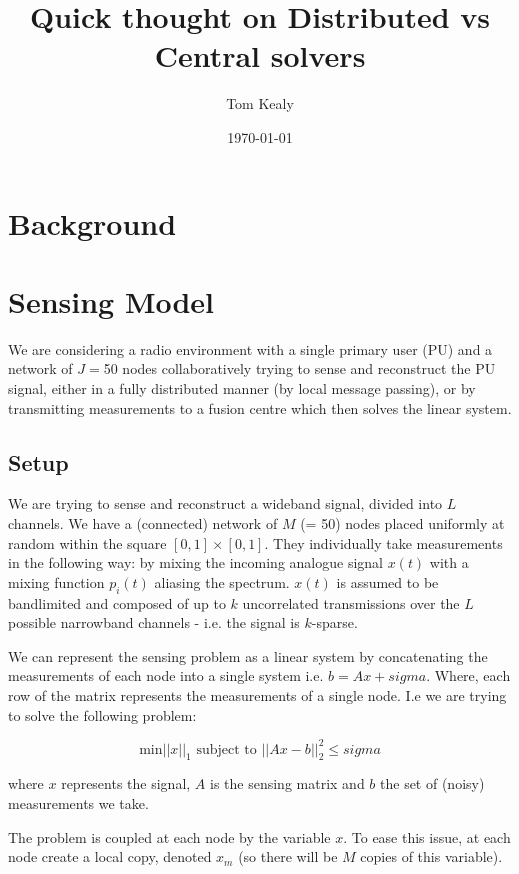\documentclass{article}
\begin{document}
\nocite{*}
\title{Quick thought on Distributed vs Central solvers}
\date{\today}
\author{Tom Kealy}
\maketitle

\section{Background}
\section{Sensing Model}
\label{sensingmodel}
We are considering a radio environment with a single primary user (PU) and a network of \(J=\)50 nodes collaboratively trying to sense and reconstruct the PU signal, either in a fully distributed manner (by local message passing), or by transmitting measurements to a fusion centre which then solves the linear system. 

\subsection{Setup}
We are trying to sense and reconstruct a wideband signal, divided into \(L\) channels. We have a (connected) network of \(M\) (= 50) nodes placed uniformly at random within the square \(  \left[0,1\right]\times \left[0,1\right] \). They individually take measurements in the following way: by mixing the incoming analogue signal \(x\left(t\right)\) with a mixing function \(p_i\left(t\right)\) aliasing the spectrum. \(x\left(t\right)\) is assumed to be bandlimited and composed of up to \(k\) uncorrelated transmissions over the \(L\) possible narrowband channels - i.e. the signal is \(k\)-sparse. 

We can represent the sensing problem as a linear system by concatenating the measurements of each node into a single system i.e. \(b = Ax + sigma\). Where, each row of the matrix represents the measurements of a single node. I.e we are trying to solve the following problem:

\begin{equation}
\text{min} ||x||_1 \text{ subject to } ||Ax - b||_2^2  \leq sigma
\end{equation}

where \(x\) represents the signal, \(A\) is the sensing matrix and \(b\) the set of (noisy) measurements we take.

The problem is coupled at each node by the variable \(x\). To ease this issue, at each node create a local copy, denoted \(x_m\) (so there will be \(M\) copies of this variable). 
\end{document}

